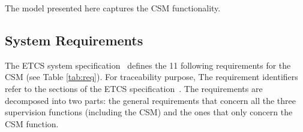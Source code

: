 The model presented here captures the CSM functionality.



\subsection{System Requirements}
\label{sec:sysreq}
The ETCS system specification~\cite{ETCSSRS-Principles} defines the 11
following requirements for the CSM (see Table \ref{tab:req}). For
traceability purpose, The requirement identifiers refer to the
sections of the ETCS specification~\cite{ETCSSRS-Principles}. The
requirements are decomposed into two parts: the general requirements
that concern all the three supervision functions (including the CSM)
and the ones that only concern the CSM function.

   

